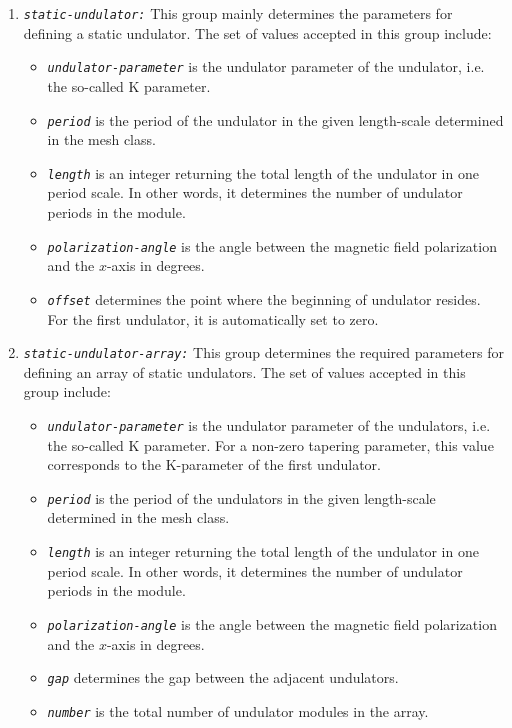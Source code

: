\begin{enumerate}
%
\item {\tt \small \em static-undulator:} This group mainly determines the parameters for defining a static undulator. The set of values accepted in this group include:
%
\begin{itemize}
	\item {\tt \small \em undulator-parameter} is the undulator parameter of the undulator, i.e. the so-called K parameter.
	\item {\tt \small \em period} is the period of the undulator in the given length-scale determined in the mesh class.
	\item {\tt \small \em length} is an integer returning the total length of the undulator in one period scale. In other words, it determines the number of undulator periods in the module.
    \item {\tt \small \em polarization-angle} is the angle between the magnetic field polarization and the $x$-axis in degrees.
    \item {\tt \small \em offset} determines the point where the beginning of undulator resides. For the first undulator, it is automatically set to zero.
\end{itemize}
%
\item {\tt \small \em static-undulator-array:} This group determines the required parameters for defining an array of static undulators. The set of values accepted in this group include:
%
\begin{itemize}
	\item {\tt \small \em undulator-parameter} is the undulator parameter of the undulators, i.e. the so-called K parameter. For a non-zero tapering parameter, this value corresponds to the K-parameter of the first undulator.
	\item {\tt \small \em period} is the period of the undulators in the given length-scale determined in the mesh class.
	\item {\tt \small \em length} is an integer returning the total length of the undulator in one period scale. In other words, it determines the number of undulator periods in the module.
	\item {\tt \small \em polarization-angle} is the angle between the magnetic field polarization and the $x$-axis in degrees.
	\item {\tt \small \em gap} determines the gap between the adjacent undulators.
    \item {\tt \small \em number} is the total number of undulator modules in the array.

\end{itemize}
\end{enumerate}
